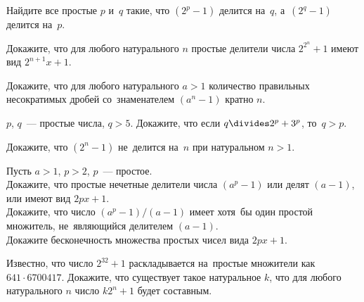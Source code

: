 \begin{problems}

\item
Найдите все простые $p$ и~$q$ такие, что $(2^p - 1)$ делится на~$q$,
а~$(2^q - 1)$ делится на~$p$.

\item
Докажите, что для любого натурального $n$ простые делители числа $2^{2^n} + 1$
имеют вид $2^{n+1} x + 1$.

\item
Докажите, что для любого натурального $a > 1$ количество правильных
несократимых дробей со~знаменателем $(a^n - 1)$ кратно $n$.

\item
$p$, $q$~--- простые числа, $q > 5$.
Докажите, что если $q \divides 2^p + 3^p$, то~$q > p$.

\item
Докажите, что $(2^n - 1)$ не~делится на~$n$ при натуральном $n > 1$.

\item
Пусть $a > 1$, $p > 2$, $p$~--- простое.
\\
\subproblem
Докажите, что простые нечетные делители числа $(a^p - 1)$ или делят $(a - 1)$,
или имеют вид $2 p x + 1$.
\\
\subproblem
Докажите, что число $(a^p - 1) / (a - 1)$ имеет хотя~бы один простой
множитель, не~являющийся делителем $(a - 1)$.
\\
\subproblem
Докажите бесконечность множества простых чисел вида $2 p x + 1$.

\item
Известно, что число $2^{32} + 1$ раскладывается на~простые множители как
$641 \cdot 6700417$.
Докажите, что существует такое натуральное $k$, что для любого
натурального $n$ число $k 2^n + 1$ будет составным.

\end{problems}

\endgroup %

